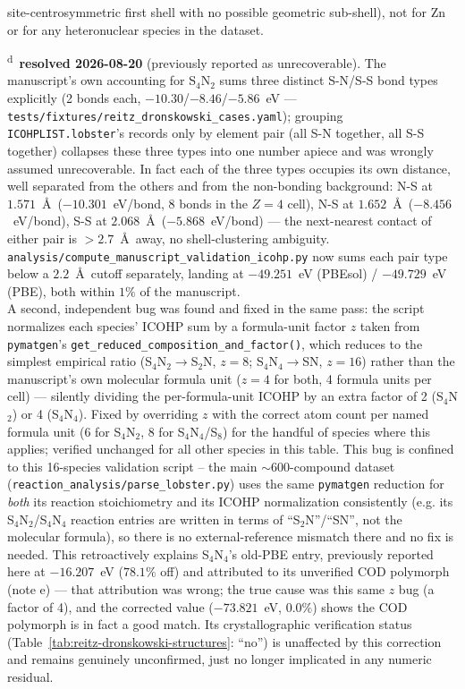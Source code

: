 site-centrosymmetric first shell with no possible geometric sub-shell), not for Zn or for any heteronuclear species in the dataset.

\noindent\textsuperscript{d}~\textbf{resolved 2026-08-20} (previously reported as unrecoverable). The manuscript's own accounting for S$_4$N$_2$ sums three distinct S-N/S-S bond types explicitly (2 bonds each, $-10.30$/$-8.46$/$-5.86$~eV --- \texttt{tests/fixtures/reitz\_dronskowski\_cases.yaml}); grouping \texttt{ICOHPLIST.lobster}'s records only by element pair (all S-N together, all S-S together) collapses these three types into one number apiece and was wrongly assumed unrecoverable. In fact each of the three types occupies its own distance, well separated from the others and from the non-bonding background: N-S at $1.571$~\AA\ ($-10.301$~eV/bond, 8 bonds in the $Z=4$ cell), N-S at $1.652$~\AA\ ($-8.456$~eV/bond), S-S at $2.068$~\AA\ ($-5.868$~eV/bond) --- the next-nearest contact of either pair is $>2.7$~\AA\ away, no shell-clustering ambiguity. \texttt{analysis/compute\_manuscript\_validation\_icohp.py} now sums each pair type below a $2.2$~\AA\ cutoff separately, landing at $-49.251$~eV (PBEsol) / $-49.729$~eV (PBE), both within $1\%$ of the manuscript.\\
\indent A second, independent bug was found and fixed in the same pass: the script normalizes each species' ICOHP sum by a formula-unit factor $z$ taken from \texttt{pymatgen}'s \texttt{get\_reduced\_composition\_and\_factor()}, which reduces to the simplest empirical ratio (S$_4$N$_2\to$S$_2$N, $z=8$; S$_4$N$_4\to$SN, $z=16$) rather than the manuscript's own molecular formula unit ($z=4$ for both, 4 formula units per cell) --- silently dividing the per-formula-unit ICOHP by an extra factor of 2 (S$_4$N$_2$) or 4 (S$_4$N$_4$). Fixed by overriding $z$ with the correct atom count per named formula unit (6 for S$_4$N$_2$, 8 for S$_4$N$_4$/S$_8$) for the handful of species where this applies; verified unchanged for all other species in this table. This bug is confined to this 16-species validation script -- the main $\sim$600-compound dataset (\texttt{reaction\_analysis/parse\_lobster.py}) uses the same \texttt{pymatgen} reduction for \emph{both} its reaction stoichiometry and its ICOHP normalization consistently (e.g. its S$_4$N$_2$/S$_4$N$_4$ reaction entries are written in terms of ``S$_2$N''/``SN'', not the molecular formula), so there is no external-reference mismatch there and no fix is needed. This retroactively explains S$_4$N$_4$'s old-PBE entry, previously reported here at $-16.207$~eV ($78.1\%$ off) and attributed to its unverified COD polymorph (note e) --- that attribution was wrong; the true cause was this same $z$ bug (a factor of 4), and the corrected value ($-73.821$~eV, $0.0\%$) shows the COD polymorph is in fact a good match. Its crystallographic verification status (Table~\ref{tab:reitz-dronskowski-structures}: ``no'') is unaffected by this correction and remains genuinely unconfirmed, just no longer implicated in any numeric residual.

